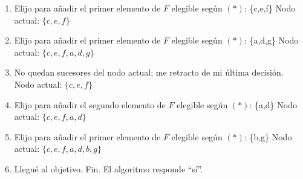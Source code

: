 \documentclass{article}
\begin{document}
\begin{enumerate}
\begin{enumerate}
\item Elijo para añadir el primer elemento de $F$ elegible según $(*)$: \{c,e,f\}
      Nodo actual: $\{c, e, f\}$

\item Elijo para añadir el primer elemento de $F$ elegible según $(*)$: \{a,d,g\}
      Nodo actual: $\{c,e,f,a,d,g\}$

\item No quedan sucesores del nodo actual; me retracto de mi última decisión.
      Nodo actual: $\{c, e, f\}$

\item Elijo para añadir el segundo elemento de $F$ elegible según $(*)$: \{a,d\}
      Nodo actual: $\{c, e, f, a, d\}$

\item Elijo para añadir el primer elemento de $F$ elegible según $(*)$: \{b,g\}
      Nodo actual: $\{c, e, f, a, d, b, g\}$

\item Llegué al objetivo. Fin. El algoritmo responde ``sí''.
\end{enumerate}

\end{enumerate}

\section{}
\end{document}
